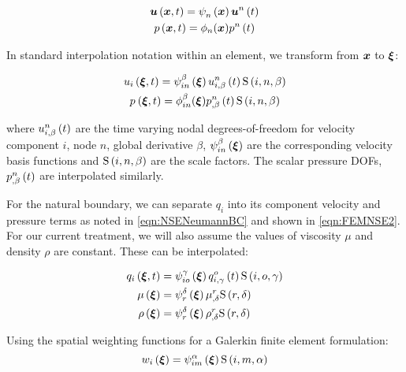 \begin{gather}
  \fnof{\vectr{u}}{\vectr{x},t}=\gbfn{n}{}{\vectr{x}}\fnof{\nodept{\vectr{u}}{n}}{t}\\
  \fnof{p}{\vectr{x},t}=\phi_{n}({\vectr{x}})\fnof{\nodept{p}{n}}{t}
\end{gather}

In standard interpolation notation within an element, we transform from $\vectr{x}$ to $\vectr{\xi}$:

\begin{gather}
  \fnof{u_{i}}{\vectr{\xi},t}=\idxgbfn{i}{n}{\beta}{\vectr{\xi}}
  \fnof{\idxnodedof{u}{i}{n}{\beta}}{t}\idxgsf{i}{n}{\beta}\\
  \fnof{p_{}}{\vectr{\xi},t}=\phi_{in}^{\beta}({\vectr{\xi}})
  \fnof{\idxnodedof{p}{}{n}{\beta}}{t}\idxgsf{i}{n}{\beta}
\end{gather}

where $\fnof{\idxnodedof{u}{i}{n}{\beta}}{t}$ are the time varying nodal degrees-of-freedom for velocity component $i$, node $n$, global derivative $\beta$, $\idxgbfn{i}{n}{\beta}{\vectr{\xi}}$ are the corresponding velocity basis functions and $\idxgsf{i}{n}{\beta}$ are the scale factors. The scalar pressure DOFs, $\fnof{\idxnodedof{p}{}{n}{\beta}}{t}$ are interpolated similarly.

For the natural boundary, we can separate $q_i$ into its component velocity and pressure terms as noted in \ref{eqn:NSENeumannBC} and shown in \ref{eqn:FEMNSE2}. For our current treatment, we will also assume the values of viscosity $\mu$ and density $\rho$ are constant. These can be interpolated:

\begin{equation}
  \begin{split}
    \fnof{q_{i}}{\vectr{\xi},t} &= \idxgbfn{i}{o}{\gamma}{\vectr{\xi}}
      \fnof{\idxnodedof{q}{i}{o}{\gamma}}{t}\idxgsf{i}{o}{\gamma} \\
    \fnof{\mu}{\vectr{\xi}} &=\gbfn{r}{\delta}{\vectr{\xi}}
    \nodedof{\mu}{r}{\delta}\gsf{r}{\delta} \\
    \fnof{\rho}{\vectr{\xi}} &=\gbfn{r}{\delta}{\vectr{\xi}}\nodedof{\rho}{r}{\delta}
    \gsf{r}{\delta} \\
  \end{split}
\end{equation}

 Using the spatial weighting functions for a Galerkin finite element formulation:
\begin{equation}
  \fnof{w_{i}}{\vectr{\xi}}=\idxgbfn{i}{m}{\alpha}{\vectr{\xi}}\idxgsf{i}{m}{\alpha}
\end{equation}


